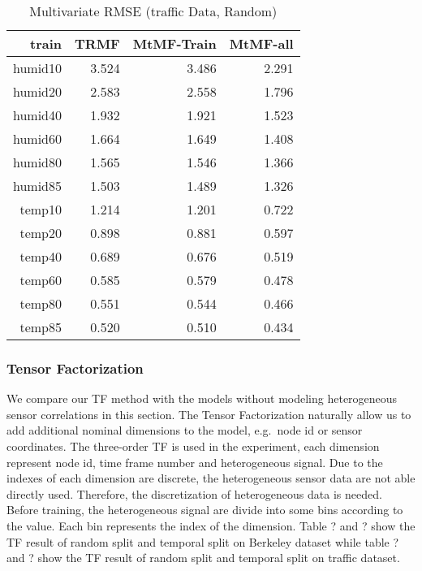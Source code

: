 \begin{table}[htbp]
\setlength{\tabcolsep}{2pt}
\centering
\caption{Multivariate RMSE (traffic Data, Random)}
\label{table_multi_traffic_random}
\begin{tabular}{r | r r r}
train	&TRMF	&MtMF-Train	&MtMF-all \\ \hline
humid10	&3.524 	&3.486 	&2.291\\  
humid20	&2.583 	&2.558 	&1.796\\
humid40	&1.932 	&1.921 	&1.523\\
humid60	&1.664 	&1.649 	&1.408\\
humid80	&1.565 	&1.546 	&1.366\\
humid85	&1.503 	&1.489 	&1.326\\
 temp10	&1.214 	&1.201 	&0.722\\
 temp20	&0.898 	&0.881 	&0.597\\
 temp40	&0.689 	&0.676 	&0.519\\
 temp60	&0.585 	&0.579 	&0.478\\
 temp80	&0.551 	&0.544 	&0.466\\
 temp85	&0.520 	&0.510 	&0.434\\
\end{tabular}
\end{table}

\subsubsection{Tensor Factorization} %
We compare our TF method with the models without modeling heterogeneous sensor correlations in this section.
The Tensor Factorization naturally allow us to add additional nominal dimensions to the model, e.g.\ node id or sensor coordinates.
The three-order TF is used in the experiment, each dimension represent node id, time frame number and heterogeneous signal.  
Due to the indexes of each dimension are discrete, the heterogeneous sensor data are not able directly used.
Therefore, the discretization of heterogeneous data is needed.
Before training, the heterogeneous signal are divide into some bins according to the value.
Each bin represents the index of the dimension.
Table ? and ? show the TF result of random split and temporal split on Berkeley dataset while table ? and ? show the TF result of random split and temporal split on traffic dataset.

